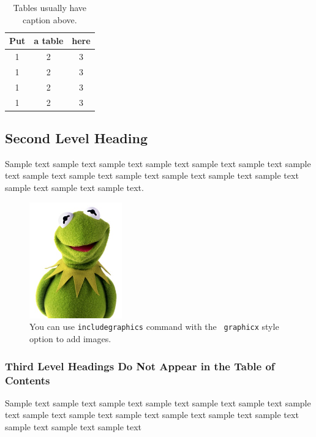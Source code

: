 \documentclass[11pt]{uonthesis}
\begin{document}
\begin{table}
\caption{Tables usually have caption above.}
\centering
\begin{tabular}{c|cc}\hline\hline
Put & a table & here \\
\hline
1 & 2 & 3 \\
1 & 2 & 3 \\
1 & 2 & 3 \\
1 & 2 & 3
\end{tabular}
\end{table}


\subsection{Second Level Heading}

Sample text sample text sample text sample text sample text sample
text sample text sample text sample text sample text sample text
sample text sample text sample text sample text sample text.

\begin{figure}
\centering
\includegraphics[width=40mm]{kermit.jpg}
\caption{You can use {\tt includegraphics} command with the {\tt
    graphicx} style option to add images.}
\end{figure}


\subsubsection{Third Level Headings Do Not Appear in the Table of Contents}

Sample text sample text sample text sample text sample text sample
text sample text sample text sample text sample text sample text
sample text sample text sample text sample text sample text~\cite{Lam94}

\end{document}
